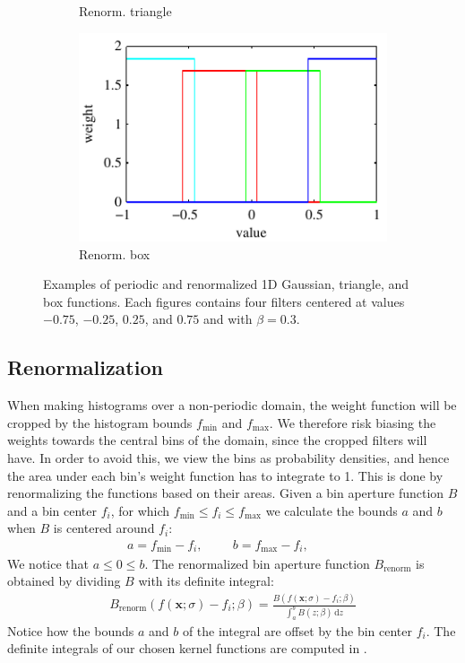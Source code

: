 \documentclass[thesis.tex]{subfiles}
\def\x{\mathbf{x}}
\begin{document}
\begin{figure}[tb]
\begin{subfigure}[t]{0.32\textwidth}
		\caption{Renorm. triangle}
		\label{fig:1dFilterTriangleRenorm}
	\end{subfigure}
	\begin{subfigure}[t]{0.32\textwidth}
		\includegraphics[width=\textwidth]{img/binFilterBoxRenorm.pdf}
		\caption{Renorm. box}
		\label{fig:1dFilterBoxRenorm}
	\end{subfigure}
	\caption{Examples of periodic and renormalized 1D Gaussian, triangle, and box functions. Each figures contains four filters centered at values $-0.75$, $-0.25$, $0.25$, and $0.75$ and with $\beta = 0.3$.}
	\label{fig:1dFilters}
\end{figure}

\subsection{Renormalization}
When making histograms over a non-periodic domain, the weight function will be cropped by the histogram bounds $f_\text{min}$ and $f_\text{max}$. We therefore risk biasing the weights towards the central bins of the domain, since the cropped filters will have. In order to avoid this, we view the bins as probability densities, and hence the area under each bin's weight function has to integrate to 1. This is done by renormalizing the functions based on their areas. Given a bin aperture function $B$ and a bin center $f_i$, for which $f_\text{min} \leq f_i \leq f_\text{max}$ we calculate the bounds $a$ and $b$ when $B$ is centered around $f_i$:
\begin{align*}
	a = f_\text{min} - f_i,\hspace{1cm}
	b = f_\text{max} - f_i,\hspace{1cm}
\end{align*}
We notice that $a \leq 0 \leq b$. The renormalized bin aperture function $B_\text{renorm}$ is obtained by dividing $B$ with its definite integral:
\begin{align*}
	B_\text{renorm}\left( f(\x;\sigma)-f_i;\beta \right) = \frac{B \left(f(\x;\sigma)-f_i;\beta \right)}{\int_a^b B \left( z;\beta \right)\,\text{d}z}
\end{align*}
Notice how the bounds $a$ and $b$ of the integral are offset by the bin center $f_i$. The definite integrals of our chosen kernel functions are computed in .
\end{document}

